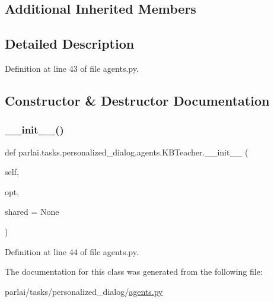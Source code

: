 \subsection*{Additional Inherited Members}


\subsection{Detailed Description}


Definition at line 43 of file agents.\+py.



\subsection{Constructor \& Destructor Documentation}
\mbox{\label{classparlai_1_1tasks_1_1personalized__dialog_1_1agents_1_1KBTeacher_a1e5c4c2117b3fee7d37aa919d961b2f2}} 
\subsubsection{\texorpdfstring{\+\_\+\+\_\+init\+\_\+\+\_\+()}{\_\_init\_\_()}}
{\footnotesize\ttfamily def parlai.\+tasks.\+personalized\+\_\+dialog.\+agents.\+K\+B\+Teacher.\+\_\+\+\_\+init\+\_\+\+\_\+ (\begin{DoxyParamCaption}\item[{}]{self,  }\item[{}]{opt,  }\item[{}]{shared = {\ttfamily None} }\end{DoxyParamCaption})}



Definition at line 44 of file agents.\+py.



The documentation for this class was generated from the following file\+:\begin{DoxyCompactItemize}
\item 
parlai/tasks/personalized\+\_\+dialog/\hyperlink{parlai_2tasks_2personalized__dialog_2agents_8py}{agents.\+py}\end{DoxyCompactItemize}
